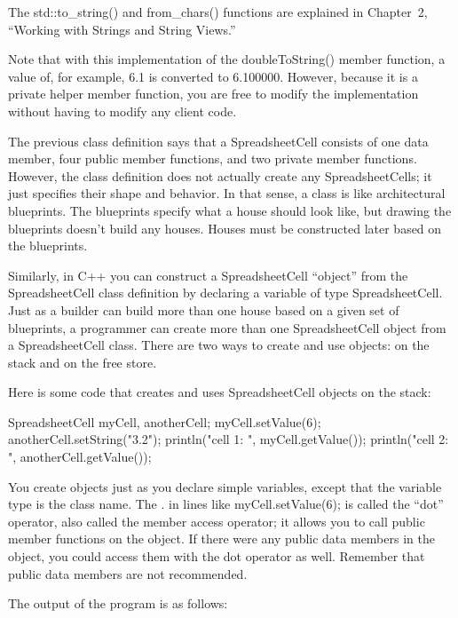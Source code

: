 The std::to\_string() and from\_chars() functions are explained in Chapter 2, “Working with Strings and String Views.”

Note that with this implementation of the doubleToString() member function, a value of, for example, 6.1 is converted to 6.100000. However, because it is a private helper member function, you are free to modify the implementation without having to modify any client code.



The previous class definition says that a SpreadsheetCell consists of one data member, four public member functions, and two private member functions. However, the class definition does not actually create any SpreadsheetCells; it just specifies their shape and behavior. In that sense, a class is like architectural blueprints. The blueprints specify what a house should look like, but drawing the blueprints doesn’t build any houses. Houses must be constructed later based on the blueprints.

Similarly, in C++ you can construct a SpreadsheetCell “object” from the SpreadsheetCell class definition by declaring a variable of type SpreadsheetCell. Just as a builder can build more than one house based on a given set of blueprints, a programmer can create more than one SpreadsheetCell object from a SpreadsheetCell class. There are two ways to create and use objects: on the stack and on the free store.


Here is some code that creates and uses SpreadsheetCell objects on the stack:

\begin{cpp}
SpreadsheetCell myCell, anotherCell;
myCell.setValue(6);
anotherCell.setString("3.2");
println("cell 1: {}", myCell.getValue());
println("cell 2: {}", anotherCell.getValue());
\end{cpp}

You create objects just as you declare simple variables, except that the variable type is the class name. The . in lines like myCell.setValue(6); is called the “dot” operator, also called the member access operator; it allows you to call public member functions on the object. If there were any public data members in the object, you could access them with the dot operator as well. Remember that public data members are not recommended.

The output of the program is as follows:

